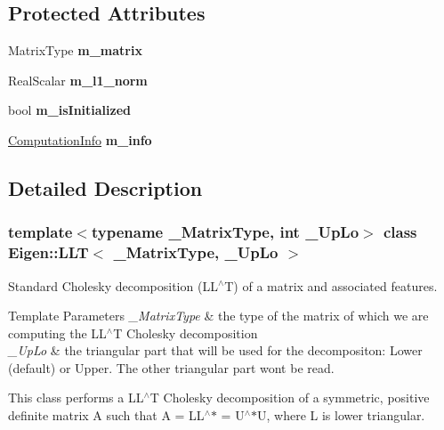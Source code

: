 \subsection*{Protected Attributes}
\begin{DoxyCompactItemize}
\item 
\mbox{\label{class_eigen_1_1_l_l_t_ab632f0e414857af3782efbdc8a71a986}} 
Matrix\+Type {\bfseries m\+\_\+matrix}
\item 
\mbox{\label{class_eigen_1_1_l_l_t_a1e499b31d6f7c8411ec99602eef76ec8}} 
Real\+Scalar {\bfseries m\+\_\+l1\+\_\+norm}
\item 
\mbox{\label{class_eigen_1_1_l_l_t_a9dff09bd7ff28372f9c7fd81972f1059}} 
bool {\bfseries m\+\_\+is\+Initialized}
\item 
\mbox{\label{class_eigen_1_1_l_l_t_a40964f05dfde7eb3a964e9df50a905e5}} 
\mbox{\hyperlink{group__enums_ga85fad7b87587764e5cf6b513a9e0ee5e}{Computation\+Info}} {\bfseries m\+\_\+info}
\end{DoxyCompactItemize}


\subsection{Detailed Description}
\subsubsection*{template$<$typename \+\_\+\+Matrix\+Type, int \+\_\+\+Up\+Lo$>$\newline
class Eigen\+::\+L\+L\+T$<$ \+\_\+\+Matrix\+Type, \+\_\+\+Up\+Lo $>$}

Standard Cholesky decomposition (L\+L$^\wedge$T) of a matrix and associated features. 


\begin{DoxyTemplParams}{Template Parameters}
{\em \+\_\+\+Matrix\+Type} & the type of the matrix of which we are computing the L\+L$^\wedge$T Cholesky decomposition \\
\hline
{\em \+\_\+\+Up\+Lo} & the triangular part that will be used for the decompositon\+: Lower (default) or Upper. The other triangular part won\textquotesingle{}t be read.\\
\hline
\end{DoxyTemplParams}
This class performs a L\+L$^\wedge$T Cholesky decomposition of a symmetric, positive definite matrix A such that A = L\+L$^\wedge$$\ast$ = U$^\wedge$$\ast$U, where L is lower triangular.

